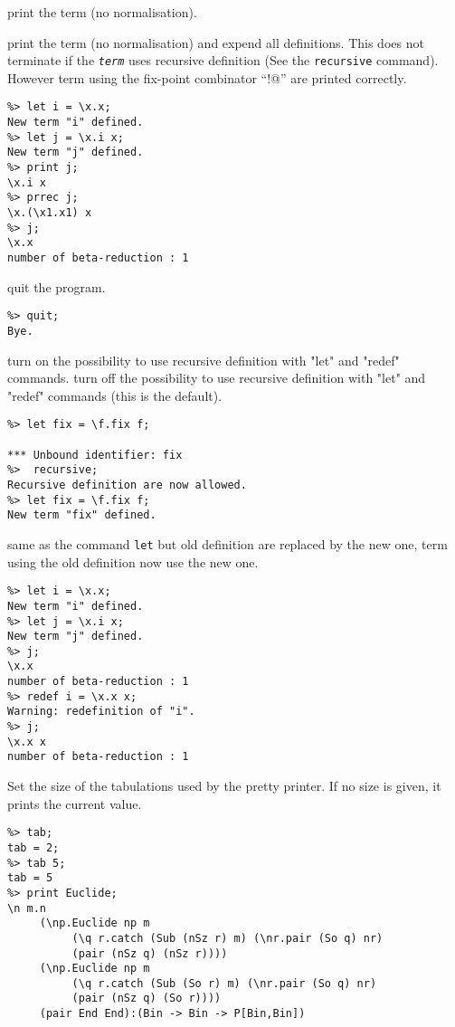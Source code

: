{{\begin{definition}
        print the term (no normalisation).

        print the term (no normalisation) and expend all definitions.
        This does not terminate if the {\tt\it term} uses recursive definition
        (See the {\tt recursive} command). However term using the fix-point
        combinator ``\verb@!@'' are printed correctly. 
\begin{verbatim}
%> let i = \x.x;
New term "i" defined.
%> let j = \x.i x;
New term "j" defined.
%> print j;
\x.i x
%> prrec j;
\x.(\x1.x1) x
%> j;
\x.x
number of beta-reduction : 1
\end{verbatim}
          
        quit the program.
\begin{verbatim}
%> quit;
Bye.
\end{verbatim}
        
        turn on the possibility to use recursive definition 
          with "let" and "redef" commands.
        turn off the possibility to use recursive definition 
          with "let" and "redef" commands (this is the default).
\begin{verbatim}
%> let fix = \f.fix f;

*** Unbound identifier: fix
%>  recursive;
Recursive definition are now allowed.
%> let fix = \f.fix f;
New term "fix" defined.
\end{verbatim}
          
 same as the command {\tt let} but old
          definition are replaced by the new one, term using the old
          definition now use the new one.
\begin{verbatim}
%> let i = \x.x;
New term "i" defined.
%> let j = \x.i x;
New term "j" defined.
%> j;
\x.x
number of beta-reduction : 1
%> redef i = \x.x x;
Warning: redefinition of "i".
%> j;
\x.x x
number of beta-reduction : 1
\end{verbatim}

        Set the size of the tabulations used by the pretty printer. If no size
        is given, it prints the current value.

\begin{verbatim}
%> tab;
tab = 2;
%> tab 5;
tab = 5
%> print Euclide;
\n m.n
     (\np.Euclide np m
          (\q r.catch (Sub (nSz r) m) (\nr.pair (So q) nr)
          (pair (nSz q) (nSz r))))
     (\np.Euclide np m
          (\q r.catch (Sub (So r) m) (\nr.pair (So q) nr)
          (pair (nSz q) (So r))))
     (pair End End):(Bin -> Bin -> P[Bin,Bin])
\end{verbatim}
        

\end{definition}}}
